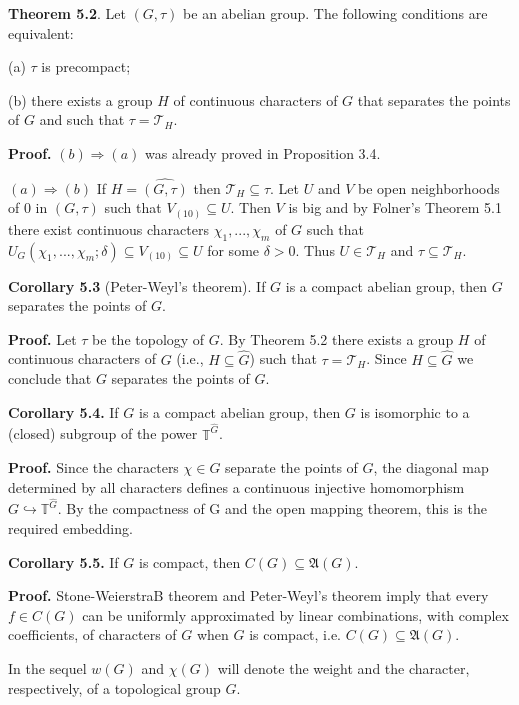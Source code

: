\documentclass[12pt]{article}
\begin{document}
\textbf{Theorem 5.2}. Let $(G, \tau)$ be an abelian group. The following conditions are equivalent:

\begin{itemize}

    (a) $\tau$ is precompact;

    (b) there exists a group $H$ of continuous characters of $G$ that separates the points of $G$ and such that $\tau = \mathcal{T}_H$.

\end{itemize}

\textbf{Proof.} $(b) \Rightarrow (a)$ was already proved in Proposition 3.4.


$(a) \Rightarrow (b)$ If $H = \hat{(G, \tau)}$ then $\mathcal{T}_H \subseteq τ$. Let $U$ and $V$ be open neighborhoods of 0 in $(G, \tau)$ such that $V_{(10)} \subseteq U$. Then $V$ is
big and by Folner's Theorem 5.1 there exist continuous characters $\chi_1,...,\chi_m$ of $G$ such that $U_G(\chi_1,...,\chi_m; \delta) \subseteq V_{(10)} \subseteq U$
for some $\delta > 0$. Thus $U \in \mathcal{T}_H$ and $τ \subseteq \mathcal{T}_H$.


\textbf{Corollary 5.3} (Peter-Weyl's theorem). If $G$ is a compact abelian group, then $G$ separates the points of $G$.


\textbf{Proof.} Let $\tau$ be the topology of $G$. By Theorem 5.2 there exists a group $H$ of continuous characters of $G$ (i.e., $H \subseteq \hat{G}$) such
that $\tau = \mathcal{T}_H$. Since $H \subseteq \hat{G}$ we conclude that $G$ separates the points of $G$. 


\textbf{Corollary 5.4.} If $G$ is a compact abelian group, then $G$ is isomorphic to a (closed) subgroup of the power $\mathbb{T}^{\hat{G}}$.


\textbf{Proof.} Since the characters $\chi \in G$ separate the points of $G$, the diagonal map determined by all characters defines a continuous
injective homomorphism $G \hookrightarrow \mathbb{T}^{\hat{G}}$. By the compactness of G and the open mapping theorem, this is the required
embedding. 


\textbf{Corollary 5.5.} If $G$ is compact, then $C(G) \subseteq \mathfrak{A}(G)$.


\textbf{Proof.} Stone-WeierstraB theorem and Peter-Weyl's theorem imply that every $f ∈ C(G)$ can be uniformly approximated by
linear combinations, with complex coefficients, of characters of $G$ when $G$ is compact, i.e. $C(G) \subseteq \mathfrak{A}(G)$. 


    In the sequel $w(G)$ and $\chi(G)$ will denote the weight and the character, respectively, of a topological group $G$.
\end{document}
